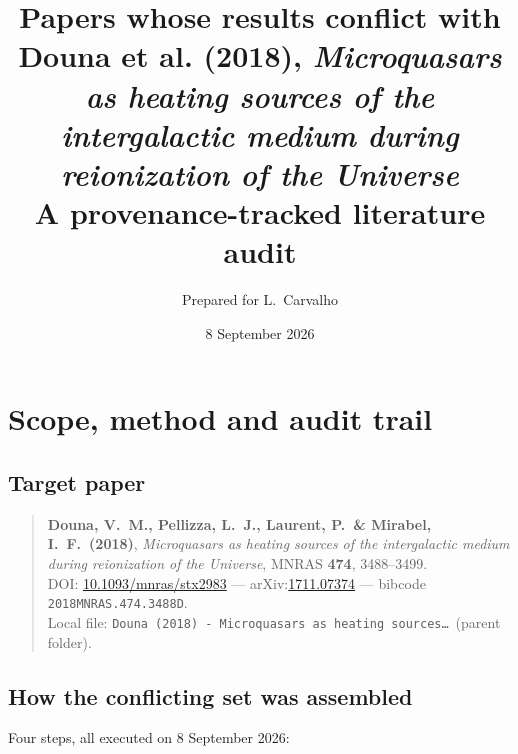 \documentclass[11pt,a4paper]{article}
\title{\bfseries Papers whose results conflict with\\
Douna et al. (2018), \emph{Microquasars as heating sources of the\\
intergalactic medium during reionization of the Universe}\\[6pt]
\large A provenance-tracked literature audit}
\author{Prepared for L.\ Carvalho}
\date{8 September 2026}
\begin{document}
\maketitle

\section{Scope, method and audit trail}

\subsection{Target paper}

\begin{quote}
\textbf{Douna, V.~M., Pellizza, L.~J., Laurent, P.\ \& Mirabel, I.~F.\ (2018)},
\emph{Microquasars as heating sources of the intergalactic medium during
reionization of the Universe}, MNRAS \textbf{474}, 3488--3499.\\
DOI: \href{https://doi.org/10.1093/mnras/stx2983}{10.1093/mnras/stx2983} ---
arXiv:\href{https://arxiv.org/abs/1711.07374}{1711.07374} ---
bibcode \texttt{2018MNRAS.474.3488D}.\\
Local file: \texttt{Douna (2018) - Microquasars as heating sources\dots}\ (parent folder).
\end{quote}

\subsection{How the conflicting set was assembled}

Four steps, all executed on 8 September 2026:
\end{document}
